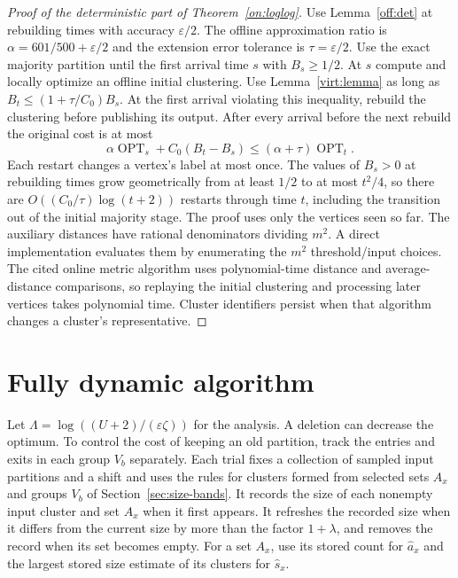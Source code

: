 \documentclass[11pt]{article}
\begin{document}
\begin{proof}[Proof of the deterministic part of Theorem~\ref{on:loglog}]
Use Lemma~\ref{off:det} at rebuilding times with accuracy $\varepsilon/2$.
The offline approximation ratio is $\alpha=601/500+\varepsilon/2$ and the extension
error tolerance is $\tau=\varepsilon/2$.
Use the exact majority partition until the first arrival time $s$ with
$B_s\ge1/2$. At $s$ compute and locally optimize an offline initial clustering. Use
Lemma~\ref{virt:lemma} as long as
$B_t\le(1+\tau/C_0)B_s$. At the first arrival violating this inequality,
rebuild the clustering before publishing its output. After every arrival before
the next rebuild the original cost is at most
\[
 \alpha\operatorname{OPT}_s+C_0(B_t-B_s)
 \le (\alpha+\tau)\operatorname{OPT}_t.
\]
Each restart changes a vertex's label at most once. The values of $B_s>0$ at rebuilding
times grow geometrically from at least $1/2$ to at most $t^2/4$,
so there are $O((C_0/\tau)\log(t+2))$ restarts through time $t$,
including the transition out of the initial majority stage. The proof
uses only the vertices seen so far. The auxiliary distances have
rational denominators dividing $m^2$. A direct implementation evaluates
them by enumerating the $m^2$ threshold/input choices. The cited online
metric algorithm uses polynomial-time distance and average-distance
comparisons, so replaying the initial clustering and processing later vertices takes
polynomial time. Cluster identifiers persist when that algorithm changes
a cluster's representative.
\end{proof}

\section{Fully dynamic algorithm}
\label{sec:dyn-band}
\DynamicMain*

Let $\Lambda=\log((U+2)/(\varepsilon\zeta))$ for the analysis.
A deletion can decrease the optimum. To control the cost of keeping
an old partition, track the entries and exits in each group $V_b$ separately.
Each trial fixes a collection of sampled input partitions and a shift and uses the rules for clusters formed
from selected sets $A_x$ and
groups $V_b$ of Section~\ref{sec:size-bands}. It records the size of each
nonempty input cluster and set $A_x$ when it first appears. It refreshes the
recorded size when it differs from the current size by more than the
factor $1+\lambda$, and removes the record when its set becomes empty. For a set $A_x$, use its
stored count for $\widehat a_x$ and the largest stored size estimate of
its clusters for $\widehat s_x$.
\end{document}
